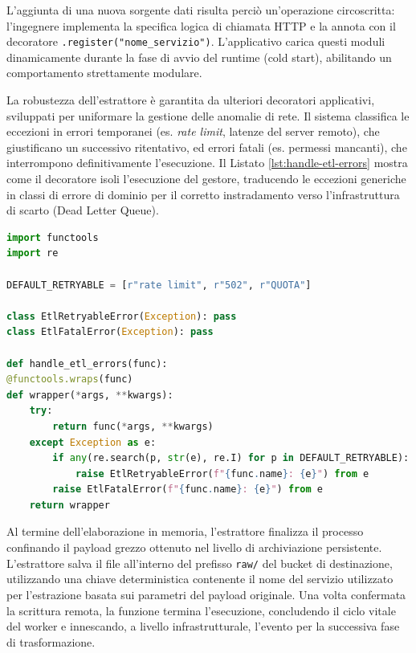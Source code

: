 L'aggiunta di una nuova sorgente dati risulta perciò un'operazione circoscritta: l'ingegnere implementa la specifica logica di chiamata HTTP e la annota con il decoratore \texttt{\@ServiceRegistry.register("nome\_servizio")}. L'applicativo carica questi moduli dinamicamente durante la fase di avvio del runtime (cold start), abilitando un comportamento strettamente modulare.

La robustezza dell'estrattore è garantita da ulteriori decoratori applicativi, sviluppati per uniformare la gestione delle anomalie di rete. Il sistema classifica le eccezioni in errori temporanei (es. \emph{rate limit}, latenze del server remoto), che giustificano un successivo ritentativo, ed errori fatali (es. permessi mancanti), che interrompono definitivamente l'esecuzione. Il Listato \ref{lst:handle-etl-errors} mostra come il decoratore isoli l'esecuzione del gestore, traducendo le eccezioni generiche in classi di errore di dominio per il corretto instradamento verso l'infrastruttura di scarto (Dead Letter Queue).

\begin{lstlisting}[language=Python,caption={Decoratore per la classificazione e gestione uniforme degli errori di rete},label={lst:handle-etl-errors}]
import functools
import re

DEFAULT_RETRYABLE = [r"rate limit", r"502", r"QUOTA"]

class EtlRetryableError(Exception): pass
class EtlFatalError(Exception): pass

def handle_etl_errors(func):
@functools.wraps(func)
def wrapper(*args, **kwargs):
    try:
        return func(*args, **kwargs)
    except Exception as e:
        if any(re.search(p, str(e), re.I) for p in DEFAULT_RETRYABLE):
            raise EtlRetryableError(f"{func.name}: {e}") from e
        raise EtlFatalError(f"{func.name}: {e}") from e
    return wrapper
\end{lstlisting}

Al termine dell'elaborazione in memoria, l'estrattore finalizza il processo confinando il payload grezzo ottenuto nel livello di archiviazione persistente. L'estrattore salva il file all'interno del prefisso \texttt{raw/} del bucket di destinazione, utilizzando una chiave deterministica contenente il nome del servizio utilizzato per l'estrazione basata sui parametri del payload originale. Una volta confermata la scrittura remota, la funzione termina l'esecuzione, concludendo il ciclo vitale del worker e innescando, a livello infrastrutturale, l'evento per la successiva fase di trasformazione.


